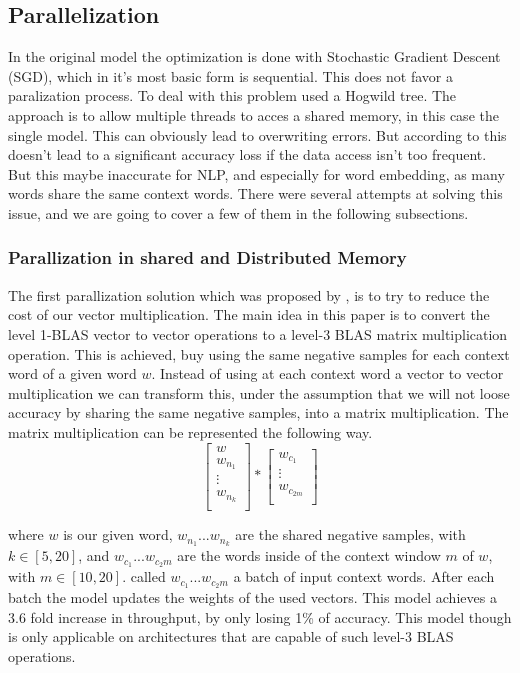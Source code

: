 \subsection{Parallelization}
In the original model the optimization is done with Stochastic Gradient Descent (SGD), which in it's most basic form is sequential. This does not favor a paralization process. To deal with this problem \cite{mikolov2} used a Hogwild tree. The approach is to allow multiple threads to acces a shared memory, in this case the single model. This can obviously lead to overwriting errors. But according to \cite{hogwild} this doesn't lead to a significant accuracy loss if the data access isn't too frequent. But this maybe inaccurate for NLP, and especially for word embedding, as many words share the same context words. There were several attempts at solving this issue, and we are going to cover a few of them in the following subsections. 

\subsubsection{Parallization in shared and Distributed Memory}
The first parallization solution which was proposed by \cite{intel}, is to try to reduce the cost of our vector multiplication. The main idea in this paper is to convert the level 1-BLAS vector to vector operations to a level-3 BLAS matrix multiplication operation. This is achieved, buy using the same negative samples for each context word of a given word $w$. Instead of using at each context word a vector to vector multiplication we can transform this, under the assumption that we will not loose accuracy by sharing the same negative samples, into a matrix multiplication. The matrix multiplication can be represented the following way.
\[
\begin{bmatrix}
w \\
w_{n_1}  \\
\vdots \\
w_{n_k}\\
\end{bmatrix}
*
\begin{bmatrix}
w_{c_1}\\
\vdots\\
w_{c_{2m}}\\
\end{bmatrix}
\]

where $w$ is our given word, $w_{n_1}...w_{n_k}$ are the shared negative samples, with $k \in [5,20]$, and $w_{c_1}...w_{c_2m}$ are the words inside of the context window $m$ of $w$, with $m \in [10,20]$. \cite{intel} called $w_{c_1}...w_{c_2m}$ a batch of input context words. After each batch the model updates the weights of the used vectors. 
This model achieves a 3.6 fold increase in throughput, by only losing 1\% of accuracy. This model though is only applicable on architectures that are capable of such level-3 BLAS operations.
